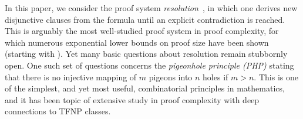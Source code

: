\documentclass{article}
\newcommand{\introduceterm}[1]{{\emph{#1}}}
\numberwithin{equation}{section}
\begin{document}
In this paper, we consider the proof system
\introduceterm{resolution}~\cite{Blake37Thesis}, in which one derives
new disjunctive clauses 
from the
formula until an
explicit contradiction is reached.
This is arguably the most well-studied proof system
in proof complexity, for which numerous exponential lower
bounds on proof size have been shown (starting with
\cite{CS88ManyHard,Haken85Intractability,Urquhart87HardExamples}).
Yet many basic questions about resolution remain stubbornly open.
One such set of questions concerns the
\introduceterm{pigeonhole principle (PHP)}
stating that there is no injective mapping of $m$ pigeons into $n$
holes if $m > n$.  This is one of the simplest, 
and yet most useful, combinatorial principles in mathematics, and it
has been topic of extensive study in proof complexity with deep
connections to TFNP classes.
\end{document}
